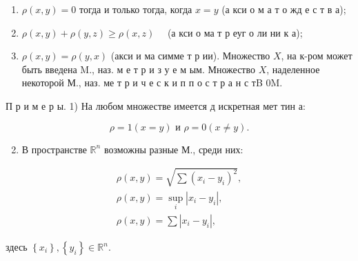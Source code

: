 \documentclass[10pt]{article}
\begin{document}
\begin{enumerate}

  \item $\rho(x, y)=0$ тогда и только тогда, когда $x=y$ (а кси о м а т о жд е с т в а);



  \item $\rho(x, y)+\rho(y, z) \geqslant \rho(x, z) \quad$ (а кси о ма т р еуг о ли ни к а);



  \item $\rho(x, y)=\rho(y, x)$ (акси и ма симме т р ии). Множество $X$, на к-ром может быть введена M., наз. м е т р и з у е м ым. Множество $X$, наделенное некоторой М., наз. ме т р и ч е с к и п п о с т р а н с тB $0 \mathrm{M}$.



\end{enumerate}



П р и м е р ы. 1) На любом множестве имеется д искретная мет тин а:



\[

\rho=1(x=y) \text { и } \rho=0(x \neq y) .

\]



\begin{enumerate}

  \setcounter{enumi}{1}

  \item В пространстве $\mathbb{R}^{n}$ возможны разные М., среди них:

\end{enumerate}



\[

\begin{gathered}

\rho(x, y)=\sqrt{\sum\left(x_{i}-y_{i}\right)^{2}}, \\

\rho(x, y)=\sup _{i}\left|x_{i}-y_{i}\right|, \\

\rho(x, y)=\sum\left|x_{i}-y_{i}\right|,

\end{gathered}

\]



здесь $\left\{x_{i}\right\},\left\{y_{i}\right\} \in \mathbb{R}^{n}$.
\end{document}
